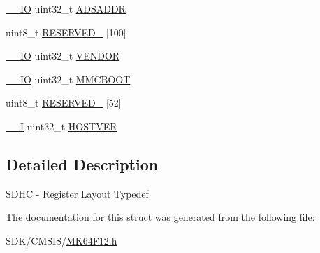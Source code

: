 \begin{DoxyCompactItemize}
\item 
\mbox{\hyperlink{core__cm4_8h_aec43007d9998a0a0e01faede4133d6be}{\+\_\+\+\_\+\+IO}} uint32\+\_\+t \mbox{\hyperlink{group___v_r_e_f___peripheral___access___layer_gab418d6ab842253ec1556bd0683bea1cf}{A\+D\+S\+A\+D\+DR}}
\item 
uint8\+\_\+t \mbox{\hyperlink{group___v_r_e_f___peripheral___access___layer_ga30320ad485493928a2f7198e40227043}{R\+E\+S\+E\+R\+V\+E\+D\+\_}} \mbox{[}100\mbox{]}
\item 
\mbox{\hyperlink{core__cm4_8h_aec43007d9998a0a0e01faede4133d6be}{\+\_\+\+\_\+\+IO}} uint32\+\_\+t \mbox{\hyperlink{group___v_r_e_f___peripheral___access___layer_ga87a1f785e501e18ed2c06222b361741f}{V\+E\+N\+D\+OR}}
\item 
\mbox{\hyperlink{core__cm4_8h_aec43007d9998a0a0e01faede4133d6be}{\+\_\+\+\_\+\+IO}} uint32\+\_\+t \mbox{\hyperlink{group___v_r_e_f___peripheral___access___layer_gaf8e7ecba38e254125b45008783ff62c3}{M\+M\+C\+B\+O\+OT}}
\item 
uint8\+\_\+t \mbox{\hyperlink{group___v_r_e_f___peripheral___access___layer_ga1e23711e9e444e5d829041e531103d74}{R\+E\+S\+E\+R\+V\+E\+D\+\_}} \mbox{[}52\mbox{]}
\item 
\mbox{\hyperlink{core__cm4_8h_af63697ed9952cc71e1225efe205f6cd3}{\+\_\+\+\_\+I}} uint32\+\_\+t \mbox{\hyperlink{group___v_r_e_f___peripheral___access___layer_ga6fb8df4ccedb41b45d7103c792355b8b}{H\+O\+S\+T\+V\+ER}}
\end{DoxyCompactItemize}


\subsection{Detailed Description}
S\+D\+HC -\/ Register Layout Typedef 

The documentation for this struct was generated from the following file\+:\begin{DoxyCompactItemize}
\item 
S\+D\+K/\+C\+M\+S\+I\+S/\mbox{\hyperlink{_m_k64_f12_8h}{M\+K64\+F12.\+h}}\end{DoxyCompactItemize}
